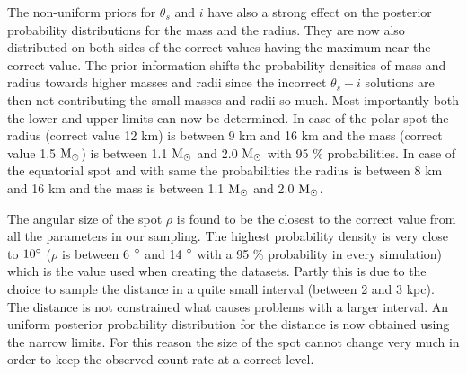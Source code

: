 \documentclass{wihuri}
\def\msun{{\rm M_{\odot}}}
\def\thetas{\theta_{s}}
\begin{document}
The non-uniform priors for $\thetas$ and $i$ have also a strong effect on the posterior probability distributions for the mass and the radius. They are now also distributed on both sides of the correct values having the maximum near the correct value. The prior information shifts the probability densities of mass and radius towards higher masses and radii since the incorrect $\thetas - i$ solutions are then not contributing the small masses and radii so much. Most importantly both the lower and upper limits can now be determined. In case of the polar spot the radius (correct value 12 km) is between 9 km and 16 km and the mass (correct value 1.5 $\msun$) is between 1.1 $\msun$ and 2.0 $\msun$ with 95 \% probabilities. In case of the equatorial spot and with same the probabilities the radius is between 8 km and 16 km and the mass is between 1.1 $\msun$ and 2.0 $\msun$.

The angular size of the spot $\rho$ is found to be the closest to the correct value from all the  parameters in our sampling. The highest probability density is very close to $10 \degree$ ($\rho$ is between 6 $\degree$ and 14 $\degree$ with a 95 \% probability in every simulation) which is the value used when creating the datasets. Partly this is due to the choice to sample the distance in a quite small interval (between 2 and 3 kpc). The distance is not constrained what causes problems with a larger interval. An uniform posterior probability distribution for the distance is now obtained using the narrow limits. For this reason the size of the spot cannot change very much in order to keep the observed count rate at a correct level.
\end{document}
